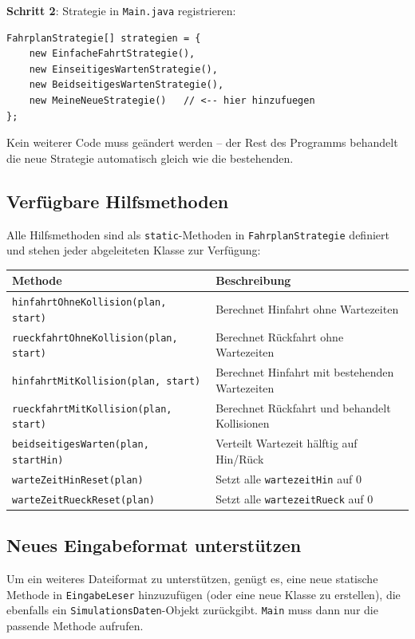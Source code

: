 \documentclass[12pt,a4paper]{article}
\begin{document}
\textbf{Schritt 2}: Strategie in \texttt{Main.java} registrieren:

\begin{lstlisting}
FahrplanStrategie[] strategien = {
    new EinfacheFahrtStrategie(),
    new EinseitigesWartenStrategie(),
    new BeidseitigesWartenStrategie(),
    new MeineNeueStrategie()   // <-- hier hinzufuegen
};
\end{lstlisting}

Kein weiterer Code muss geändert werden -- der Rest des Programms behandelt die neue Strategie automatisch gleich wie die bestehenden.

\subsection{Verfügbare Hilfsmethoden}

Alle Hilfsmethoden sind als \texttt{static}-Methoden in \texttt{FahrplanStrategie} definiert und stehen jeder abgeleiteten Klasse zur Verfügung:

\begin{center}
\begin{tabular}{lp{8.5cm}}
\toprule
\textbf{Methode} & \textbf{Beschreibung} \\
\midrule
\texttt{hinfahrtOhneKollision(plan, start)} & Berechnet Hinfahrt ohne Wartezeiten \\
\texttt{rueckfahrtOhneKollision(plan, start)} & Berechnet Rückfahrt ohne Wartezeiten \\
\texttt{hinfahrtMitKollision(plan, start)} & Berechnet Hinfahrt mit bestehenden Wartezeiten \\
\texttt{rueckfahrtMitKollision(plan, start)} & Berechnet Rückfahrt und behandelt Kollisionen \\
\texttt{beidseitigesWarten(plan, startHin)} & Verteilt Wartezeit hälftig auf Hin/Rück \\
\texttt{warteZeitHinReset(plan)} & Setzt alle \texttt{wartezeitHin} auf 0 \\
\texttt{warteZeitRueckReset(plan)} & Setzt alle \texttt{wartezeitRueck} auf 0 \\
\bottomrule
\end{tabular}
\end{center}

\subsection{Neues Eingabeformat unterstützen}

Um ein weiteres Dateiformat zu unterstützen, genügt es, eine neue statische Methode in \texttt{EingabeLeser} hinzuzufügen (oder eine neue Klasse zu erstellen), die ebenfalls ein \texttt{SimulationsDaten}-Objekt zurückgibt. \texttt{Main} muss dann nur die passende Methode aufrufen.
\end{document}
